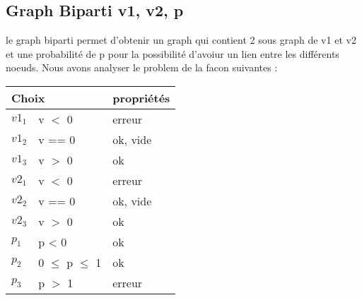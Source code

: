 \documentclass[11pt]{article}
\begin{document}
\subsection{Graph Biparti v1, v2, p}
le graph biparti permet d'obtenir un graph qui contient 2 sous graph de v1 et v2 et une probabilité de p pour la possibilité d'avoiur un lien entre les différents noeuds.
Nous avons analyser le problem de la facon suivantes :
\begin{tabular}{|l|l|l|}
 \hline
 \multicolumn{2}{|l|}{Choix} & propriétés                   \\ \hline
 ${v1}_1$                    & v $<$ 0           & erreur   \\ \hline
 ${v1}_2$                    & v == 0            & ok, vide \\ \hline
 ${v1}_3$                    & v $>$ 0           & ok       \\ \hline \hline
 ${v2}_1$                    & v $<$ 0           & erreur   \\ \hline
 ${v2}_2$                    & v == 0            & ok, vide \\ \hline
 ${v2}_3$                    & v $>$ 0           & ok       \\ \hline \hline
 $p_1$                       & p < 0             & ok       \\ \hline
 $p_2$                       & 0 $\le$ p $\le$ 1 & ok       \\ \hline
 $p_3$                       & p $>$ 1           & erreur   \\ \hline
\end{tabular}
\end{document}
